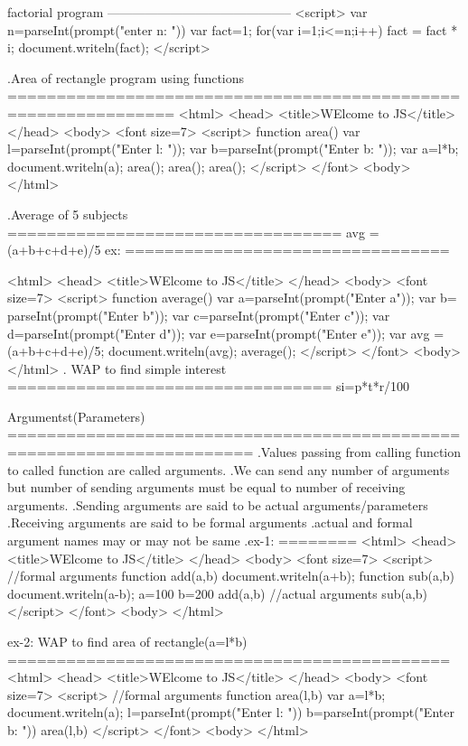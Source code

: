 factorial program
--------------------------------------------
<script>
  var n=parseInt(prompt("enter n: "))
  var fact=1;
  for(var i=1;i<=n;i++)
  {
    fact = fact * i;
  }
  document.writeln(fact);
</script>

.Area of rectangle program using functions
===============================================================
<html>
  <head>
   <title>WElcome to JS</title>
  </head>
  <body>
    <font size=7>
     <script>
		function area()
		{
			var l=parseInt(prompt("Enter l: "));
			var b=parseInt(prompt("Enter b: "));
			var a=l*b;
			document.writeln(a);
		}
		area();
		area();
		area();
	</script>
   </font>
  <body>
</html>

.Average of 5 subjects
==================================
avg = (a+b+c+d+e)/5
ex:
=================================

<html>
  <head>
   <title>WElcome to JS</title>
  </head>
  <body>
    <font size=7>
     <script>
		function average()
		{
			var a=parseInt(prompt("Enter a"));
			var b= parseInt(prompt("Enter b"));
			var c=parseInt(prompt("Enter c"));
			var d=parseInt(prompt("Enter d"));
			var e=parseInt(prompt("Enter e"));
			var avg = (a+b+c+d+e)/5;
			document.writeln(avg);
		}
		average();
	</script>
   </font>
  <body>
</html>
. WAP to find simple interest
=================================
si=p*t*r/100

Argumentst(Parameters)
=======================================================================
.Values passing from calling function to called function are called arguments.
.We can send any number of arguments but number of sending arguments must be equal to number of receiving arguments.
.Sending arguments are said to be actual arguments/parameters
.Receiving arguments are said to be formal arguments
.actual and formal argument names may or may not be same
.ex-1:
========
<html>
  <head>
   <title>WElcome to JS</title>
  </head>
  <body>
    <font size=7>
     <script>       //formal arguments
		function add(a,b)
		{
			document.writeln(a+b);
		}
		function sub(a,b)
		{
			document.writeln(a-b);
		}
		a=100
		b=200
		add(a,b) //actual arguments
		sub(a,b)
	</script>
   </font>
  <body>
</html>

ex-2: WAP to find area of rectangle(a=l*b)
=============================================
<html>
  <head>
   <title>WElcome to JS</title>
  </head>
  <body>
    <font size=7>
     <script>       //formal arguments
		function area(l,b)
		{
		  var a=l*b;
		  document.writeln(a);
		}	
		l=parseInt(prompt("Enter l: "))
		b=parseInt(prompt("Enter b: "))
		area(l,b)
	</script>
   </font>
  <body>
</html>

